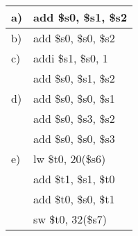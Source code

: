 \begin{tt}
\begin{center}
\begin{tabular}{|l|l|}\hline
  a) & add \$s0, \$s1, \$s2\\\hline
  b) & add \$s0, \$s0, \$s2\\\hline
  c) & addi \$s1, \$s0, 1\\
  &add \$s0, \$s1, \$s2\\\hline
  d) & add \$s0, \$s0, \$s1 \\
  & add \$s0, \$s3, \$s2\\
  & add \$s0, \$s0, \$s3 \\\hline
  e) & lw \$t0, 20(\$s6) \\
  & add \$t1, \$s1, \$t0 \\
  & add \$t0, \$s0, \$t1 \\
  & sw \$t0, 32(\$s7)\\\hline
\end{tabular}
\end{center}
\end{tt}


